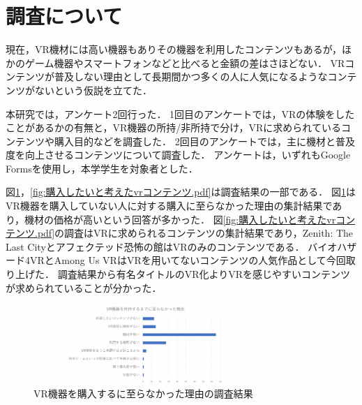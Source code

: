 \documentclass[twocolumn,10pt,a4j]{ltjsarticle}
\begin{document}



\section{調査について}
現在，VR機材には高い機器もありその機器を利用したコンテンツもあるが，ほかのゲーム機器やスマートフォンなどと比べると金額の差はさほどない．
VRコンテンツが普及しない理由として長期間かつ多くの人に人気になるようなコンテンツがないという仮説を立てた．

本研究では，アンケート2回行った．
1回目のアンケートでは，VRの体験をしたことがあるかの有無と，VR機器の所持/非所持で分け，VRに求められているコンテンツや購入目的などを調査した．
2回目のアンケートでは，主に機材と普及度を向上させるコンテンツについて調査した．
アンケートは，いずれもGoogle Formsを使用し，本学学生を対象者とした．

図\ref{fig:vr機器を所持するまでに至らなかった理由.pdf}，\ref{fig:購入したいと考えたvrコンテンツ.pdf}は調査結果の一部である．
図\ref{fig:vr機器を所持するまでに至らなかった理由.pdf}はVR機器を購入していない人に対する購入に至らなかった理由の集計結果であり，機材の価格が高いという回答が多かった．
図\ref{fig:購入したいと考えたvrコンテンツ.pdf}の調査はVRに求められるコンテンツの集計結果であり，Zenith: The Last Cityとアフェクテッド恐怖の館はVRのみのコンテンツである．
バイオハザード4VRとAmong Us VRはVRを用いてないコンテンツの人気作品として今回取り上げた．
調査結果から有名タイトルのVR化よりVRを感じやすいコンテンツが求められていることが分かった．

\begin{figure}[h]
\begin{center}
 \includegraphics[clip,width=85mm,height=30mm]{vr機器を所持するまでに至らなかった理由.pdf}
\end{center}
 \caption{VR機器を購入するに至らなかった理由の調査結果}
 \label{fig:vr機器を所持するまでに至らなかった理由.pdf}
\end{figure}
\vspace{2mm}
\end{document}
